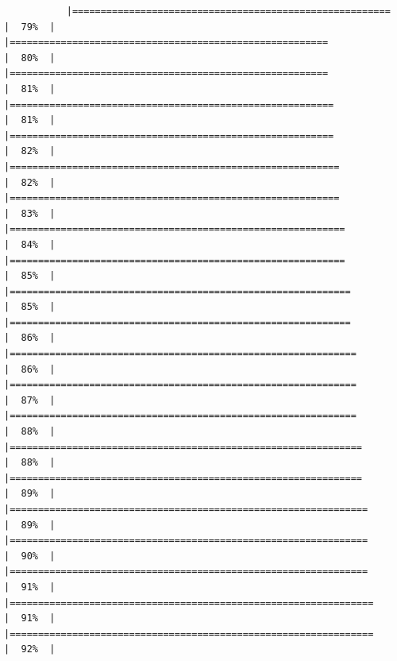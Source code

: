 \documentclass[
]{article}
\begin{document}
\begin{verbatim}
           |========================================================              |  79%  |                                                                              |========================================================              |  80%  |                                                                              |========================================================              |  81%  |                                                                              |=========================================================             |  81%  |                                                                              |=========================================================             |  82%  |                                                                              |==========================================================            |  82%  |                                                                              |==========================================================            |  83%  |                                                                              |===========================================================           |  84%  |                                                                              |===========================================================           |  85%  |                                                                              |============================================================          |  85%  |                                                                              |============================================================          |  86%  |                                                                              |=============================================================         |  86%  |                                                                              |=============================================================         |  87%  |                                                                              |=============================================================         |  88%  |                                                                              |==============================================================        |  88%  |                                                                              |==============================================================        |  89%  |                                                                              |===============================================================       |  89%  |                                                                              |===============================================================       |  90%  |                                                                              |===============================================================       |  91%  |                                                                              |================================================================      |  91%  |                                                                              |================================================================      |  92%  |                                                                    
\end{verbatim}
\end{document}
